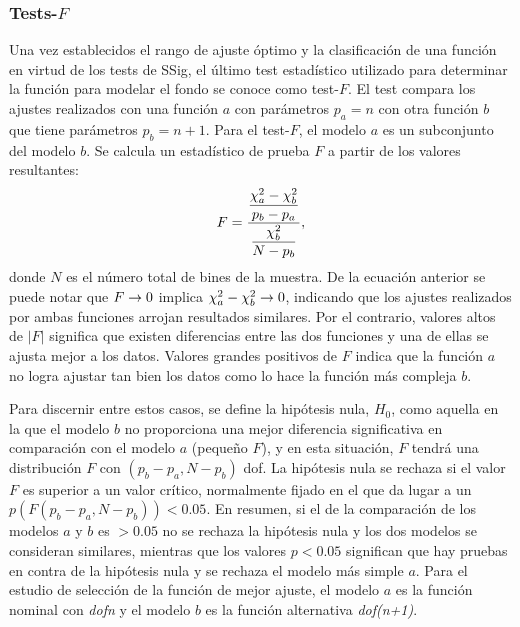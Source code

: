 \subsubsection{Tests-\(F\)}
\label{subsubsec:bkg:modeling:preparation:ftest}

Una vez establecidos el rango de ajuste óptimo y la clasificación de una función en virtud de los tests de \ac{SSig}, el último test estadístico utilizado para determinar la función para modelar el fondo se conoce como test-\(F\). El test compara los ajustes realizados con una función \(a\) con parámetros \(p_a = n\) con otra función \(b\) que tiene parámetros \(p_b = n+1\). Para el test-\(F\), el modelo \(a\) es un subconjunto del modelo \(b\). Se calcula un estadístico de prueba \(F\) a partir de los valores \chisq resultantes:
\begin{equation}
    \label{eq:bkg:modeling:preparation:ftest:ftest}
    F = \frac{
        \displaystyle
        \frac{\chi^{2}_a - \chi^{2}_b}{p_b - p_a}
    }{
        \displaystyle
        \frac{\chi^{2}_b}{N - p_b}
    },
\end{equation}
donde \(N\) es el número total de bines de la muestra. De la ecuación anterior se puede notar que \(F \rightarrow 0\) implica \(\chi^{2}_a - \chi^{2}_b \rightarrow 0\), indicando que los ajustes realizados por ambas funciones arrojan resultados similares. Por el contrario, valores altos de \(|F|\) significa que existen diferencias entre las dos funciones y una de ellas se ajusta mejor a los datos.
Valores grandes positivos de \(F\) indica que la función \(a\) no logra ajustar tan bien los datos como lo hace la función más compleja \(b\).



Para discernir entre estos casos, se define la hipótesis nula, \(H_0\), como aquella en la que el modelo \(b\) no proporciona una mejor diferencia significativa en comparación con el modelo \(a\) (pequeño \(F\)), y en esta situación, \(F\) tendrá una distribución \(F\) con \((p_b - p_a, N - p_b)\) \ac{dof}. La hipótesis nula se rechaza si el valor \(F\) es superior a un valor crítico, normalmente fijado en el que da lugar a un \(p\left(F(p_b-p_a, N-p_b)\right)<0.05\). En resumen, si el \pval de la comparación de los modelos \(a\) y \(b\) es \(>0.05\) no se rechaza la hipótesis nula y los dos modelos se consideran similares, mientras que los valores \(p<0.05\) significan que hay pruebas en contra de la hipótesis nula y se rechaza el modelo más simple \(a\).
Para el estudio de selección de la función de mejor ajuste, el modelo \(a\) es la función nominal con \textit{dofn} y el modelo \(b\) es la función alternativa \textit{dof(n+1)}.

